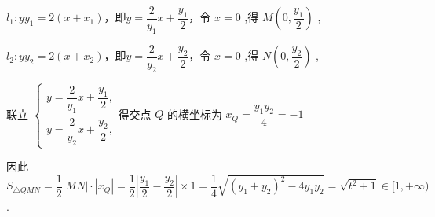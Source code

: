 \begin{enumerate}
\begin{enumerate}
\begin{jieda}
\begin{enumerate}
                ${l}_{1} : yy_1 = 2(x+x_1)$，即$y = \dfrac{2}{{y}_{1}}x + \dfrac{{y}_{1}}{2}$，令 $x = 0$ ,得 $M\left( {0,\dfrac{{y}_{1}}{2}}\right)$ ,
                
                ${l}_{2} : yy_2 = 2(x+x_2)$，即$y = \dfrac{2}{{y}_{2}}x + \dfrac{{y}_{2}}{2}$，令 $x = 0$ ,得 $N\left( {0,\dfrac{{y}_{2}}{2}}\right)$ ,
                
                联立 $\left\{  \begin{array}{l} y = \dfrac{2}{{y}_{1}}x + \dfrac{{y}_{1}}{2}, \\  y = \dfrac{2}{{y}_{2}}x + \dfrac{{y}_{2}}{2}, \end{array}\right.$得交点 $Q$ 的横坐标为 ${x}_{Q} = \dfrac{{y}_{1}{y}_{2}}{4} =  - 1$
                
                因此${S}_{\bigtriangleup {QMN}} = \dfrac{1}{2}\left| {MN}\right|  \cdot  \left| {x}_{Q}\right|  = \dfrac{1}{2}\left| {\dfrac{{y}_{1}}{2} - \dfrac{{y}_{2}}{2}}\right|  \times  1 = \dfrac{1}{4}\sqrt{{\left( {y}_{1} + {y}_{2}\right) }^{2} - 4{y}_{1}{y}_{2}} = \sqrt{{t}^{2} + 1} \in \lbrack 1, + \infty )$ .
            \end{enumerate}
        \end{jieda}


\end{enumerate}
\end{enumerate}
